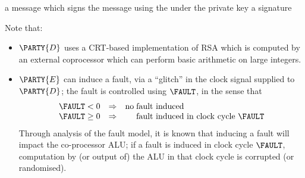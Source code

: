 %



{a message}
{which signs the message using the under the private key}
{a signature}




%
Note that:

\begin{itemize}
\item $\PARTY{D}$ uses a CRT-based implementation of RSA which is computed by
an external coprocessor which can perform basic arithmetic on large integers.

\item $\PARTY{E}$
      can induce a fault, via a ``glitch'' in the clock signal supplied to
      $\PARTY{D}$;
      the fault is controlled using $\FAULT$, in the sense that
      \[
      \begin{array}{c@{\;}c@{\;}c c c@{\;}l}
      \FAULT &<   & 0 &\Rightarrow& \mbox{no} & \mbox{fault induced                        } \\
      \FAULT &\geq& 0 &\Rightarrow&           & \mbox{fault induced in clock cycle $\FAULT$} \\
      \end{array}
      \]
      Through analysis of the fault model, it is known that inducing a fault 
      will impact the co-processor ALU; if a fault is induced in clock cycle
      $\FAULT$, computation by (or output of) the ALU in that clock cycle is
      corrupted (or randomised).
\end{itemize}

